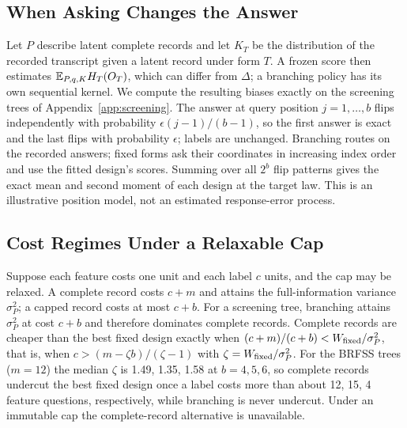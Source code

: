 \subsection{When Asking Changes the Answer}\label{app:measurement}
Let $P$ describe latent complete records and let $K_T$ be the distribution of the recorded transcript given a latent record under form $T$. A frozen score then estimates $\mathbb{E}_{P,q,K}H_T(O_T)$, which can differ from $\Delta$; a branching policy has its own sequential kernel. We compute the resulting biases exactly on the screening trees of Appendix~\ref{app:screening}. The answer at query position $j=1,\ldots,b$ flips independently with probability $\epsilon(j-1)/(b-1)$, so the first answer is exact and the last flips with probability $\epsilon$; labels are unchanged. Branching routes on the recorded answers; fixed forms ask their coordinates in increasing index order and use the fitted design's scores. Summing over all $2^b$ flip patterns gives the exact mean and second moment of each design at the target law. This is an illustrative position model, not an estimated response-error process.


\subsection{Cost Regimes Under a Relaxable Cap}\label{app:costchoice}
Suppose each feature costs one unit and each label $c$ units, and the cap may be relaxed. A complete record costs $c+m$ and attains the full-information variance $\sigma_P^2$; a capped record costs at most $c+b$. For a screening tree, branching attains $\sigma_P^2$ at cost $c+b$ and therefore dominates complete records. Complete records are cheaper than the best fixed design exactly when $(c+m)/(c+b)<W_{\rm fixed}/\sigma_P^2$, that is, when $c>(m-\zeta b)/(\zeta-1)$ with $\zeta=W_{\rm fixed}/\sigma_P^2$. For the BRFSS trees ($m=12$) the median $\zeta$ is 1.49, 1.35, 1.58 at $b=4, 5, 6$, so complete records undercut the best fixed design once a label costs more than about 12, 15, 4 feature questions, respectively, while branching is never undercut. Under an immutable cap the complete-record alternative is unavailable.
